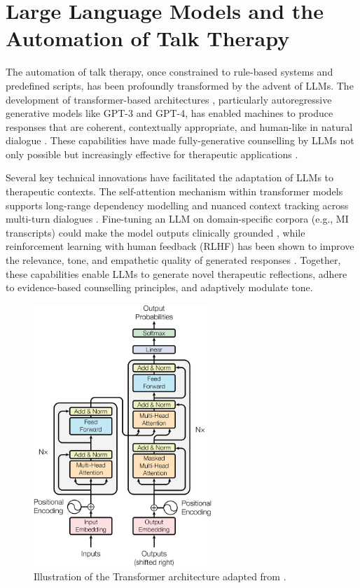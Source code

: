 \section{Large Language Models and the Automation of Talk Therapy}
The automation of talk therapy, once constrained to rule-based systems and predefined scripts, has been profoundly transformed by the advent of LLMs. The development of transformer-based architectures \cite{vaswani2017attention}, particularly autoregressive generative models like GPT-3 and GPT-4, has enabled machines to produce responses that are coherent, contextually appropriate, and human-like in natural dialogue \cite{openai2023gpt4}. These capabilities have made fully-generative counselling by LLMs not only possible but increasingly effective for therapeutic applications \cite{miner2020artificial, torous2023generative}.

Several key technical innovations have facilitated the adaptation of LLMs to therapeutic contexts. The self-attention mechanism within transformer models supports long-range dependency modelling and nuanced context tracking across multi-turn dialogues \cite{vaswani2017attention}. Fine-tuning an LLM on domain-specific corpora (e.g., MI transcripts) could make the model outputs clinically grounded \cite{valentino2024evaluating}, while reinforcement learning with human feedback (RLHF) has been shown to improve the relevance, tone, and empathetic quality of generated responses \cite{10.5555/3600270.3602281, gilson2023empathy}. Together, these capabilities enable LLMs to generate novel therapeutic reflections, adhere to evidence-based counselling principles, and adaptively modulate tone.



\begin{figure}[ht]
    \centering
    \includegraphics[width=0.6\textwidth]{fig/transformer_architecture.png}
    \caption{Illustration of the Transformer architecture adapted from \citet{vaswani2017attention}.}
    \label{fig:transformer}
\end{figure}


